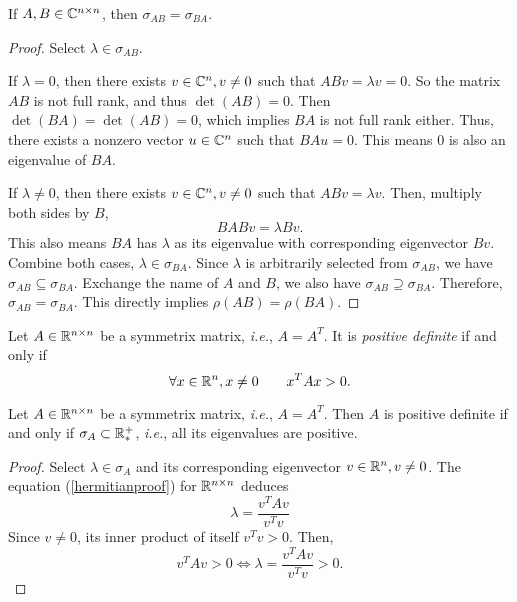 \begin{theorem}
If \(A,B\in\mathbb{C}^{n\times n}\), then \(\sigma_{AB}=\sigma_{BA}\).
\end{theorem}
\begin{proof}
Select \(\lambda\in\sigma_{AB}\).
\item If \(\lambda=0\), then there exists \(v\in\mathbb{C}^n,v\neq0\) such that \(ABv=\lambda v=0\).
So the matrix $AB$ is not full rank, and thus \(\det(AB)=0\).
Then \(\det(BA)=\det(AB)=0\), which implies $BA$ is not full rank either.
Thus, there exists a nonzero vector \(u\in\mathbb{C}^n\) such that \(BAu=0\).
This means 0 is also an eigenvalue of $BA$.
\item If \(\lambda\neq0\), then there exists \(v\in\mathbb{C}^n,v\neq0\) such that \(ABv=\lambda v\).
Then, multiply both sides by $B$,
\begin{equation*}
BABv=\lambda Bv.
\end{equation*}
This also means \(BA\) has $\lambda$ as its eigenvalue with corresponding eigenvector \(Bv\).
Combine both cases, \(\lambda\in\sigma_{BA}\).
Since $\lambda$ is arbitrarily selected from \(\sigma_{AB}\), we have \(\sigma_{AB}\subseteq\sigma_{BA}\).
Exchange the name of $A$ and $B$, we also have \(\sigma_{AB}\supseteq\sigma_{BA}\).
Therefore, \(\sigma_{AB}=\sigma_{BA}\).
This directly implies \(\rho(AB)=\rho(BA)\).
\end{proof}

\begin{definition}
Let \(A\in\mathbb{R}^{n\times n}\) be a symmetrix matrix, \textit{i.e.}, \(A=A^T\).
It is \emph{positive definite} if and only if
\[ \forall x\in\mathbb{R}^n,x\neq0 \qquad x^TAx>0.  \]
\end{definition}

\begin{theorem}
Let \(A\in\mathbb{R}^{n\times n}\) be a symmetrix matrix, \textit{i.e.}, \(A=A^T\).
Then $A$ is positive definite if and only if \(\sigma_A\subset\mathbb{R}_*^+\), \textit{i.e.}, all its eigenvalues are positive.
\end{theorem}
\begin{proof}
Select \(\lambda\in\sigma_{A}\) and its corresponding eigenvector \(v\in\mathbb{R}^n,v\neq0\).
The equation (\ref{hermitianproof}) for \(\mathbb{R}^{n\times n}\) deduces
\[ \lambda=\frac{v^T Av}{v^Tv} \]
Since \(v\neq0\), its inner product of itself \(v^Tv>0\).
Then,
\[ v^TAv>0 \iff \lambda=\frac{v^TAv}{v^Tv}>0. \]
\end{proof}



